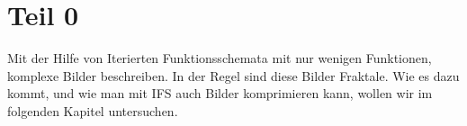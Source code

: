 %
%
%
\section{Teil 0\label{ifs:section:teil0}}
Mit der Hilfe von Iterierten Funktionsschemata mit nur wenigen Funktionen, komplexe Bilder beschreiben.
In der Regel sind diese Bilder Fraktale.
Wie es dazu kommt, und wie man mit IFS auch Bilder komprimieren kann, wollen wir im folgenden Kapitel untersuchen.


